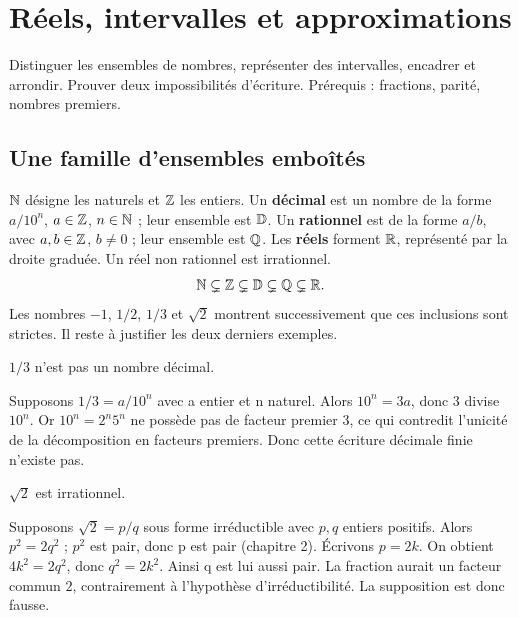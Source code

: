 \documentclass[../cours_2de.tex]{subfiles}
\begin{document}
\setcounter{chapter}{2}
\chapter{Réels, intervalles et approximations}
\label{sec:ch03}
\begin{objectif}
Distinguer les ensembles de nombres, représenter des intervalles, encadrer et arrondir. Prouver deux impossibilités d'écriture. Prérequis : fractions, parité, nombres premiers.
\end{objectif}
\section{Une famille d'ensembles emboîtés}
$\mathbb{N}$ désigne les naturels et $\mathbb{Z}$ les entiers. Un \textbf{décimal} est un nombre de la forme $a/10^n$, $a\in\mathbb{Z}$, $n\in\mathbb{N}$ ; leur ensemble est $\mathbb{D}$. Un \textbf{rationnel} est de la forme $a/b$, avec $a,b\in\mathbb{Z}$, $b\ne0$ ; leur ensemble est $\mathbb{Q}$. Les \textbf{réels} forment $\mathbb{R}$, représenté par la droite graduée. Un réel non rationnel est irrationnel.
\[
\mathbb{N}\subsetneq\mathbb{Z}\subsetneq\mathbb{D}\subsetneq\mathbb{Q}\subsetneq\mathbb{R}.
\]
Les nombres $-1$, $1/2$, $1/3$ et $\sqrt2$ montrent successivement que ces inclusions sont strictes. Il reste à justifier les deux derniers exemples.
\begin{theoreme}
$1/3$ n'est pas un nombre décimal.
\end{theoreme}
\begin{demonstration}
Supposons $1/3=a/10^n$ avec a entier et n naturel. Alors $10^n=3a$, donc $3$ divise $10^n$. Or $10^n=2^n5^n$ ne possède pas de facteur premier $3$, ce qui contredit l'unicité de la décomposition en facteurs premiers. Donc cette écriture décimale finie n'existe pas.
\end{demonstration}
\begin{theoreme}
$\sqrt2$ est irrationnel.
\end{theoreme}
\begin{demonstration}
Supposons $\sqrt2=p/q$ sous forme irréductible avec $p,q$ entiers positifs. Alors $p^2=2q^2$ ; $p^2$ est pair, donc p est pair (chapitre 2). Écrivons $p=2k$. On obtient $4k^2=2q^2$, donc $q^2=2k^2$. Ainsi q est lui aussi pair. La fraction aurait un facteur commun $2$, contrairement à l'hypothèse d'irréductibilité. La supposition est donc fausse.
\end{demonstration}
\end{document}
